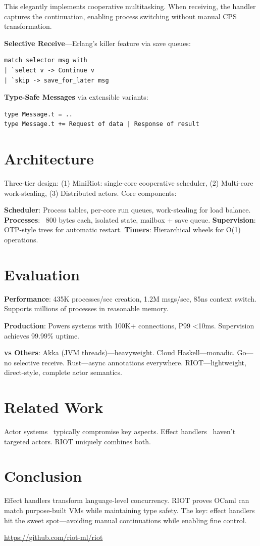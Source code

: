 \documentclass[sigplan,10pt]{acmart}
\begin{document}
This elegantly implements cooperative multitasking. When receiving, the handler captures the continuation, enabling process switching without manual CPS transformation.

\textbf{Selective Receive}—Erlang's killer feature via save queues:
\begin{lstlisting}
match selector msg with
| `select v -> Continue v
| `skip -> save_for_later msg
\end{lstlisting}

\textbf{Type-Safe Messages} via extensible variants:
\begin{lstlisting}
type Message.t = ..
type Message.t += Request of data | Response of result
\end{lstlisting}

\section{Architecture}
Three-tier design: (1) MiniRiot: single-core cooperative scheduler, (2) Multi-core work-stealing, (3) Distributed actors. Core components:

\textbf{Scheduler}: Process tables, per-core run queues, work-stealing for load balance. \textbf{Processes}: ~800 bytes each, isolated state, mailbox + save queue. \textbf{Supervision}: OTP-style trees for automatic restart. \textbf{Timers}: Hierarchical wheels for O(1) operations.

\section{Evaluation}
\textbf{Performance}: 435K processes/sec creation, 1.2M msgs/sec, 85ns context switch. Supports millions of processes in reasonable memory.

\textbf{Production}: Powers systems with 100K+ connections, P99 <10ms. Supervision achieves 99.99\% uptime.

\textbf{vs Others}: Akka (JVM threads)—heavyweight. Cloud Haskell—monadic. Go—no selective receive. Rust—async annotations everywhere. RIOT—lightweight, direct-style, complete actor semantics.

\section{Related Work}
Actor systems~\cite{akka,armstrong2003making} typically compromise key aspects. Effect handlers~\cite{ocaml5effects,koka} haven't targeted actors. RIOT uniquely combines both.

\section{Conclusion}
Effect handlers transform language-level concurrency. RIOT proves OCaml can match purpose-built VMs while maintaining type safety. The key: effect handlers hit the sweet spot—avoiding manual continuations while enabling fine control.

\url{https://github.com/riot-ml/riot}



\end{document}
